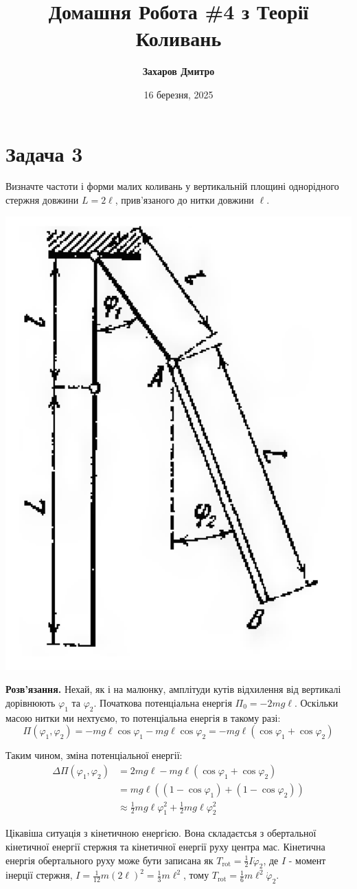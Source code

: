 \documentclass{hw_template}
\title{\bfseries Домашня Робота \#4 з Теорії Коливань}
\author{\bfseries Захаров Дмитро}
\date{16 березня, 2025}
\begin{document}
\pagestyle{fancy}

\maketitle

\section{Задача 3}


\begin{problem}
    Визначте частоти і форми малих коливань у вертикальній площині однорідного
стержня довжини $L=2\ell$, прив’язаного до нитки довжини $\ell$.
\end{problem}

\begin{center}
    \includegraphics[width=0.3\linewidth]{images/hw_4_problem_3.png}
\end{center}

\textbf{Розв'язання.} Нехай, як і на малюнку, амплітуди кутів відхилення від
вертикалі дорівнюють $\varphi_1$ та $\varphi_2$. Початкова потенціальна енергія
$\Pi_0 = -2mg\ell$. Оскільки масою нитки ми нехтуємо, то потенціальна енергія в 
такому разі:
\begin{equation*}
    \Pi(\varphi_1, \varphi_2) = -mg\ell\cos\varphi_1 - mg\ell\cos\varphi_2 = -mg\ell(\cos\varphi_1 + \cos\varphi_2)
\end{equation*}

Таким чином, зміна потенціальної енергії:
\begin{align*}
    \Delta \Pi(\varphi_1, \varphi_2) &= 2mg\ell - mg\ell(\cos\varphi_1 + \cos\varphi_2) \\
    &= mg\ell((1-\cos\varphi_1) + (1-\cos\varphi_2)) \\
    &\approx \frac{1}{2}mg\ell\varphi_1^2 + \frac{1}{2}mg\ell\varphi_2^2
\end{align*}

Цікавіша ситуація з кінетичною енергією. Вона складаєтсья з обертальної
кінетичної енергії стержня та кінетичної енергії руху центра мас. Кінетична
енергія обертального руху може бути записана як $T_{\text{rot}} =
\frac{1}{2}I\dot{\varphi}_2$, де $I$ - момент інерції стержня, $I =
\frac{1}{12}m(2\ell)^2 = \frac{1}{3}m\ell^2$, тому $T_{\text{rot}} =
\frac{1}{6}m\ell^2\dot{\varphi}_2$.
\end{document}
